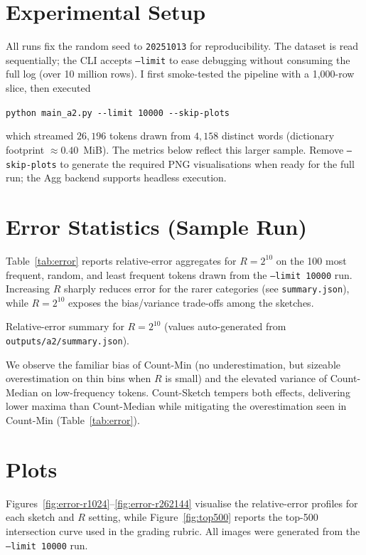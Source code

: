 \documentclass[11pt]{article}
\begin{document}
\section{Experimental Setup}
All runs fix the random seed to \texttt{20251013} for reproducibility. The dataset is read sequentially; the CLI accepts \texttt{--limit} to ease debugging without consuming the full log (over 10 million rows). I first smoke-tested the pipeline with a 1{,}000-row slice, then executed
\begin{center}
\verb|python main_a2.py --limit 10000 --skip-plots|
\end{center}
which streamed $26{,}196$ tokens drawn from $4{,}158$ distinct words (dictionary footprint $\approx 0.40$~MiB). The metrics below reflect this larger sample. Remove \texttt{--skip-plots} to generate the required PNG visualisations when ready for the full run; the Agg backend supports headless execution.

\section{Error Statistics (Sample Run)}
Table~\ref{tab:error} reports relative-error aggregates for $R=2^{10}$ on the 100 most frequent, random, and least frequent tokens drawn from the \texttt{--limit 10000} run. Increasing $R$ sharply reduces error for the rarer categories (see \texttt{summary.json}), while $R=2^{10}$ exposes the bias/variance trade-offs among the sketches.

\begin{table}[H]
  \centering
  \caption{Relative-error summary for $R=2^{10}$ (values auto-generated from \texttt{outputs/a2/summary.json}).}
  \label{tab:error}
  
\end{table}

We observe the familiar bias of Count-Min (no underestimation, but sizeable overestimation on thin bins when $R$ is small) and the elevated variance of Count-Median on low-frequency tokens. Count-Sketch tempers both effects, delivering lower maxima than Count-Median while mitigating the overestimation seen in Count-Min (Table~\ref{tab:error}).

\section{Plots}
Figures~\ref{fig:error-r1024}--\ref{fig:error-r262144} visualise the relative-error profiles for each sketch and $R$ setting, while Figure~\ref{fig:top500} reports the top-500 intersection curve used in the grading rubric. All images were generated from the \texttt{--limit 10000} run.
\end{document}
